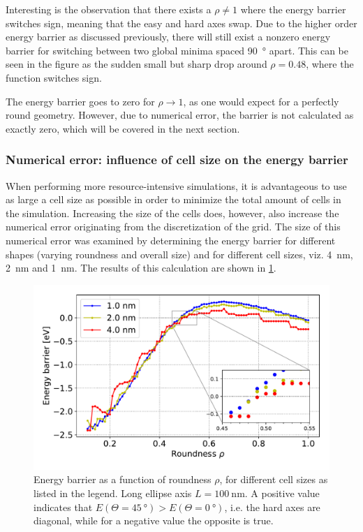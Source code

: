 \documentclass[11pt,a4paper,english]{article}
\begin{document}
Interesting is the observation that there exists a $\rho \neq 1$ where the energy barrier switches sign, meaning that the easy and hard axes swap. Due to the higher order energy barrier as discussed previously, there will still exist a nonzero energy barrier for switching between two global minima spaced \SI{90}{\degree} apart. This can be seen in the figure as the sudden small but sharp drop around $\rho = 0.48$, where the function switches sign.

The energy barrier goes to zero for $\rho \rightarrow 1$, as one would expect for a perfectly round geometry. However, due to numerical error, the barrier is not calculated as exactly zero, which will be covered in the next section.

\subsubsection{Numerical error: influence of cell size on the energy barrier}
When performing more resource-intensive simulations, it is advantageous to use as large a cell size as possible in order to minimize the total amount of cells in the simulation. Increasing the size of the cells does, however, also increase the numerical error originating from the discretization of the grid. The size of this numerical error was examined by determining the energy barrier for different shapes (varying roundness and overall size) and for different cell sizes, viz. \SI{4}{\nano\metre}, \SI{2}{\nano\metre} and \SI{1}{\nano\metre}. The results of this calculation are shown in \cref{fig:barrier-cell_size-100nm}. \par
\begin{figure}
    \centering
    \includegraphics[width=0.9\columnwidth]{Figures/biaxial_island/Barrier/Plus_100_0.1-1_aPi128_B0.01_cell1,2,4nm.pdf}
    \caption{Energy barrier as a function of roundness $\rho$, for different cell sizes as listed in the legend. Long ellipse axis $L=\SI{100}{\nano\metre}$. A positive value indicates that $E(\Theta=\SI{45}{\degree}) > E(\Theta=\SI{0}{\degree})$, i.e. the hard axes are diagonal, while for a negative value the opposite is true.}
    \label{fig:barrier-cell_size-100nm}
\end{figure}
\end{document}
